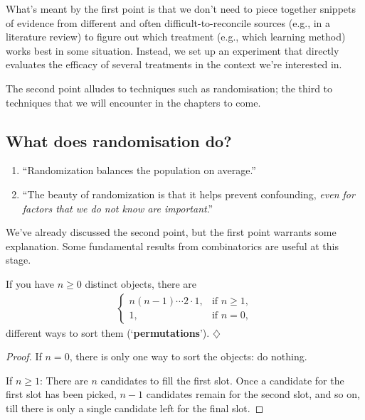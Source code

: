 \documentclass[a4paper]{tufte-book}\usepackage[]{graphicx}\usepackage[]{xcolor}
\newcommand{\term}[1]{\textbf{#1}}
\newcommand*{\parend}[1][$\diamondsuit$]{%
  \unskip\nobreak\hspace{1em plus 1fill}$\diamondsuit$%
}
\begin{document}
What's meant by the first point is that we don't need to piece together snippets of evidence
from different and often difficult-to-reconcile sources (e.g., in a literature review) to figure
out which treatment (e.g., which learning method) works best in some situation.
Instead, we set up an experiment that directly evaluates the efficacy of several treatments
in the context we're interested in.

The second point alludes to techniques such as randomisation; the third to techniques
that we will encounter in the chapters to come.

\subsection{What does randomisation do?}
\begin{enumerate}
 \item ``Randomization balances the population on average.''
 \item ``The beauty of randomization is that it helps prevent confounding, \emph{even
for factors that we do not know are important}.'' \citep[p.~15, my emphasis]{Oehlert2010}
\end{enumerate}

We've already discussed the second point, 
but the first point warrants some explanation.
Some fundamental results from combinatorics are useful at this stage.

\label{lemma:permutations}
  If you have $n \geq 0$ distinct objects,
  there are 
  \begin{align*}
    \begin{cases}
      n(n-1)\cdots 2 \cdot 1, & \textrm{if $n \geq 1$}, \\
      1,                      & \textrm{if $n = 0$},
    \end{cases}
  \end{align*}
  different ways to sort them (`\term{permutations}').
\parend

\begin{proof}
  If $n = 0$, there is only one way to sort the objects: do nothing.

  If $n \geq 1$: There are $n$ candidates to fill the first slot.
  Once a candidate for the first slot has been picked,
  $n-1$ candidates remain for the second slot, and so on,
  till there is only a single candidate left for the final slot.
\end{proof}
\end{document}
